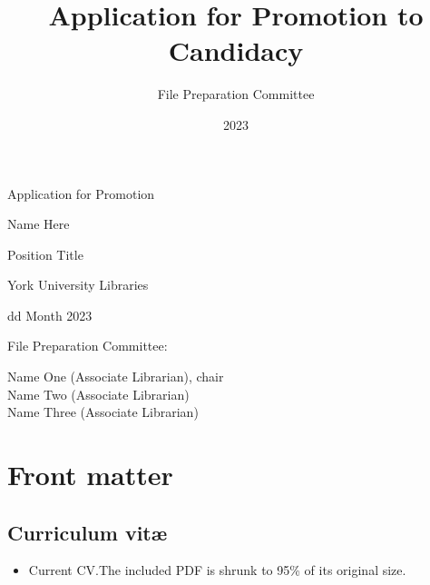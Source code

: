 \documentclass[12pt,oneside]{book}
\title{Application for Promotion to Candidacy}
\author{File Preparation Committee}
\date{2023}
\begin{document}
\frontmatter

\begin{titlepage}

  \null\vfill

  \begin{center}

    {\Huge
      Application for Promotion
    }
    \vspace{2cm}

    {\Large
      Name Here
    }
    \vspace{1cm}

  {\large
    Position Title

    York University Libraries

    \vspace{1cm}

    dd Month 2023

  }

\end{center}

\vfill
\vfill

{\large
  File Preparation Committee:

  Name One (Associate Librarian), chair \\
  \indent Name Two (Associate Librarian) \\
  \indent Name Three (Associate Librarian)
}

\hfill

\end{titlepage}



\tableofcontents

\mainmatter{}

\chapter{Front matter}


\section{Curriculum vit\ae}

\begin{itemize}
  \item Current CV.\@  The included PDF is shrunk to 95\% of its original size.
\end{itemize}
\end{document}
